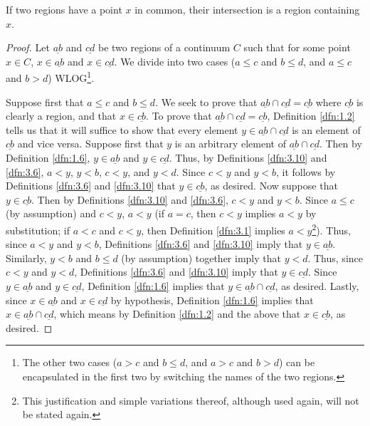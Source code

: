 \documentclass[../main.tex]{subfiles}
\begin{document}
\begin{theorem}\label{trm:3.18}
    If two regions have a point $x$ in common, their intersection is a region containing $x$.
    \begin{proof}
        Let $\underline{ab}$ and $\underline{cd}$ be two regions of a continuum $C$ such that for some point $x\in C$, $x\in\underline{ab}$ and $x\in\underline{cd}$. We divide into two cases ($a\leq c$ and $b\leq d$, and $a\leq c$ and $b>d$) WLOG\footnote{The other two cases ($a>c$ and $b\leq d$, and $a>c$ and $b>d$) can be encapsulated in the first two by switching the names of the two regions.}.\par
        Suppose first that $a\leq c$ and $b\leq d$. We seek to prove that $\underline{ab}\cap\underline{cd}=\underline{cb}$ where $\underline{cb}$ is clearly a region, and that $x\in\underline{cb}$. To prove that $\underline{ab}\cap\underline{cd}=\underline{cb}$, Definition \ref{dfn:1.2} tells us that it will suffice to show that every element $y\in\underline{ab}\cap\underline{cd}$ is an element of $\underline{cb}$ and vice versa. Suppose first that $y$ is an arbitrary element of $\underline{ab}\cap\underline{cd}$. Then by Definition \ref{dfn:1.6}, $y\in\underline{ab}$ and $y\in\underline{cd}$. Thus, by Definitions \ref{dfn:3.10} and \ref{dfn:3.6}, $a<y$, $y<b$, $c<y$, and $y<d$. Since $c<y$ and $y<b$, it follows by Definitions \ref{dfn:3.6} and \ref{dfn:3.10} that $y\in\underline{cb}$, as desired. Now suppose that $y\in\underline{cb}$. Then by Definitions \ref{dfn:3.10} and \ref{dfn:3.6}, $c<y$ and $y<b$. Since $a\leq c$ (by assumption) and $c<y$, $a<y$ (if $a=c$, then $c<y$ implies $a<y$ by substitution; if $a<c$ and $c<y$, then Definition \ref{dfn:3.1} implies $a<y$\footnote{This justification and simple variations thereof, although used again, will not be stated again.}). Thus, since $a<y$ and $y<b$, Definitions \ref{dfn:3.6} and \ref{dfn:3.10} imply that $y\in\underline{ab}$. Similarly, $y<b$ and $b\leq d$ (by assumption) together imply that $y<d$. Thus, since $c<y$ and $y<d$, Definitions \ref{dfn:3.6} and \ref{dfn:3.10} imply that $y\in\underline{cd}$. Since $y\in\underline{ab}$ and $y\in\underline{cd}$, Definition \ref{dfn:1.6} implies that $y\in\underline{ab}\cap\underline{cd}$, as desired. Lastly, since $x\in\underline{ab}$ and $x\in\underline{cd}$ by hypothesis, Definition \ref{dfn:1.6} implies that $x\in\underline{ab}\cap\underline{cd}$, which means by Definition \ref{dfn:1.2} and the above that $x\in\underline{cb}$, as desired.\par

\end{proof}
\end{theorem}
\end{document}
